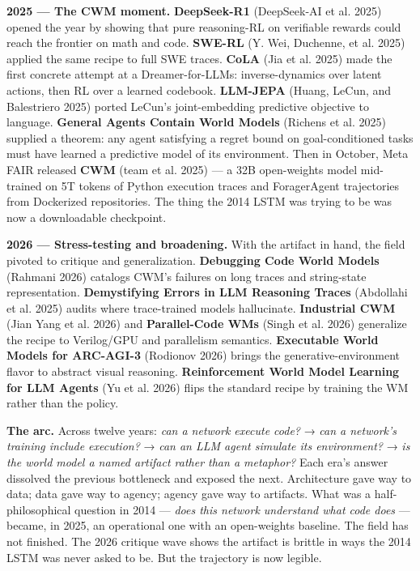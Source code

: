 \documentclass{article}
\begin{document}
\textbf{2025 --- The CWM moment.} \textbf{DeepSeek-R1} (DeepSeek-AI et
al. 2025) opened the year by showing that pure reasoning-RL on
verifiable rewards could reach the frontier on math and code.
\textbf{SWE-RL} (Y. Wei, Duchenne, et al. 2025) applied the same recipe
to full SWE traces. \textbf{CoLA} (Jia et al. 2025) made the first
concrete attempt at a Dreamer-for-LLMs: inverse-dynamics over latent
actions, then RL over a learned codebook. \textbf{LLM-JEPA} (Huang,
LeCun, and Balestriero 2025) ported LeCun's joint-embedding predictive
objective to language. \textbf{General Agents Contain World Models}
(Richens et al. 2025) supplied a theorem: any agent satisfying a regret
bound on goal-conditioned tasks must have learned a predictive model of
its environment. Then in October, Meta FAIR released \textbf{CWM} (team
et al. 2025) --- a 32B open-weights model mid-trained on 5T tokens of
Python execution traces and ForagerAgent trajectories from Dockerized
repositories. The thing the 2014 LSTM was trying to be was now a
downloadable checkpoint.

\textbf{2026 --- Stress-testing and broadening.} With the artifact in
hand, the field pivoted to critique and generalization.
\textbf{Debugging Code World Models} (Rahmani 2026) catalogs CWM's
failures on long traces and string-state representation.
\textbf{Demystifying Errors in LLM Reasoning Traces} (Abdollahi et al.
2025) audits where trace-trained models hallucinate. \textbf{Industrial
CWM} (Jian Yang et al. 2026) and \textbf{Parallel-Code WMs} (Singh et
al. 2026) generalize the recipe to Verilog/GPU and parallelism
semantics. \textbf{Executable World Models for ARC-AGI-3} (Rodionov
2026) brings the generative-environment flavor to abstract visual
reasoning. \textbf{Reinforcement World Model Learning for LLM Agents}
(Yu et al. 2026) flips the standard recipe by training the WM rather
than the policy.

\textbf{The arc.} Across twelve years: \emph{can a network execute
code?} → \emph{can a network's training include execution?} → \emph{can
an LLM agent simulate its environment?} → \emph{is the world model a
named artifact rather than a metaphor?} Each era's answer dissolved the
previous bottleneck and exposed the next. Architecture gave way to data;
data gave way to agency; agency gave way to artifacts. What was a
half-philosophical question in 2014 --- \emph{does this network
understand what code does} --- became, in 2025, an operational one with
an open-weights baseline. The field has not finished. The 2026 critique
wave shows the artifact is brittle in ways the 2014 LSTM was never asked
to be. But the trajectory is now legible.
\end{document}
